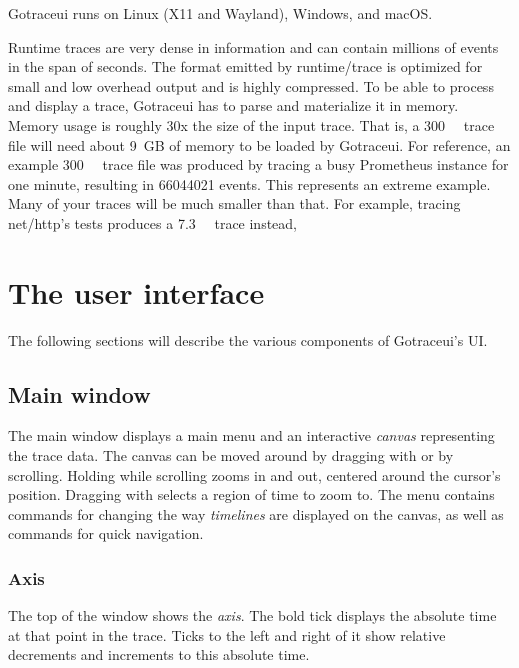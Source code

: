 \documentclass[10pt,letterpaper,oneside,openany,showtrims,draft]{memoir}
\newcommand{\code}[1]{{\ttfamily\mbox{#1}}}
\newcommand{\noun}[1]{{\emph{#1}}}
\newcommand{\shortcut}{\ctrl{} or \cmdmac}
\begin{document}
Gotraceui runs on Linux (X11 and Wayland), Windows, and macOS.

Runtime traces are very dense in information and can contain millions of events in the span of seconds.
The format emitted by \code{runtime/trace} is optimized for small and low overhead output and is highly compressed.
To be able to process and display a trace, Gotraceui has to parse and materialize it in memory.
Memory usage is roughly 30x the size of the input trace.
That is, a \qty{300}{\mega\byte} trace file will need about \qty{9}{GB} of memory to be loaded by Gotraceui.
For reference, an example \qty{300}{\mega\byte} trace file was produced by tracing a busy Prometheus instance for one minute,
resulting in \qty{66044021}{} events.
This represents an extreme example.
Many of your traces will be much smaller than that.
For example, tracing \code{net/http}'s tests produces a \qty{7.3}{\mega\byte} trace instead, 

\chapter{The user interface}
The following sections will describe the various components of Gotraceui's UI.

\section{Main window}
The main window displays a main menu and an interactive \noun{canvas} representing the trace data.
The canvas can be moved around by dragging with  or by scrolling.
Holding \keys{\shortcut} while scrolling zooms in and out, centered around the cursor's position.
Dragging with \keys{\shortcut+LMB} selects a region of time to zoom to.
The  menu contains commands for changing the way \noun{timelines} are displayed on the canvas,
as well as commands for quick navigation.

\subsection{Axis}
The top of the window shows the \noun{axis}.
The bold tick displays the absolute time at that point in the trace.
Ticks to the left and right of it show relative decrements and increments to this absolute time.
\end{document}
